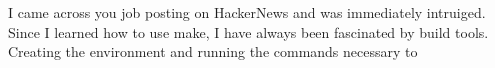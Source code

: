 I came across you job posting on HackerNews and was immediately intruiged.
Since I learned how to use make, I have always been fascinated by build tools.  Creating the environment and running the commands  necessary to 